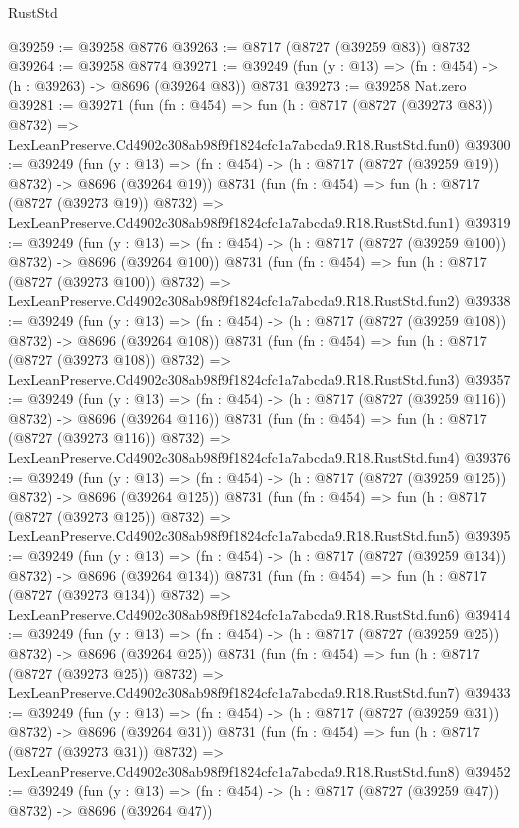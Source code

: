 \begin{lexlean}{RustStd}
\begin{coremodule}
@39259 := @39258 @8776
@39263 := @8717 (@8727 (@39259 @83)) @8732
@39264 := @39258 @8774
@39271 := @39249 (fun (y : @13) => (fn : @454) -> (h : @39263) -> @8696 (@39264 @83)) @8731
@39273 := @39258 Nat.zero
@39281 := @39271
    (fun (fn : @454) =>
    fun (h : @8717 (@8727 (@39273 @83)) @8732) =>
    LexLeanPreserve.Cd4902c308ab98f9f1824cfc1a7abcda9.R18.RustStd.fun0)
@39300 := @39249
    (fun (y : @13) => (fn : @454) -> (h : @8717 (@8727 (@39259 @19)) @8732) -> @8696 (@39264 @19))
    @8731
    (fun (fn : @454) =>
    fun (h : @8717 (@8727 (@39273 @19)) @8732) =>
    LexLeanPreserve.Cd4902c308ab98f9f1824cfc1a7abcda9.R18.RustStd.fun1)
@39319 := @39249
    (fun (y : @13) => (fn : @454) -> (h : @8717 (@8727 (@39259 @100)) @8732) -> @8696 (@39264 @100))
    @8731
    (fun (fn : @454) =>
    fun (h : @8717 (@8727 (@39273 @100)) @8732) =>
    LexLeanPreserve.Cd4902c308ab98f9f1824cfc1a7abcda9.R18.RustStd.fun2)
@39338 := @39249
    (fun (y : @13) => (fn : @454) -> (h : @8717 (@8727 (@39259 @108)) @8732) -> @8696 (@39264 @108))
    @8731
    (fun (fn : @454) =>
    fun (h : @8717 (@8727 (@39273 @108)) @8732) =>
    LexLeanPreserve.Cd4902c308ab98f9f1824cfc1a7abcda9.R18.RustStd.fun3)
@39357 := @39249
    (fun (y : @13) => (fn : @454) -> (h : @8717 (@8727 (@39259 @116)) @8732) -> @8696 (@39264 @116))
    @8731
    (fun (fn : @454) =>
    fun (h : @8717 (@8727 (@39273 @116)) @8732) =>
    LexLeanPreserve.Cd4902c308ab98f9f1824cfc1a7abcda9.R18.RustStd.fun4)
@39376 := @39249
    (fun (y : @13) => (fn : @454) -> (h : @8717 (@8727 (@39259 @125)) @8732) -> @8696 (@39264 @125))
    @8731
    (fun (fn : @454) =>
    fun (h : @8717 (@8727 (@39273 @125)) @8732) =>
    LexLeanPreserve.Cd4902c308ab98f9f1824cfc1a7abcda9.R18.RustStd.fun5)
@39395 := @39249
    (fun (y : @13) => (fn : @454) -> (h : @8717 (@8727 (@39259 @134)) @8732) -> @8696 (@39264 @134))
    @8731
    (fun (fn : @454) =>
    fun (h : @8717 (@8727 (@39273 @134)) @8732) =>
    LexLeanPreserve.Cd4902c308ab98f9f1824cfc1a7abcda9.R18.RustStd.fun6)
@39414 := @39249
    (fun (y : @13) => (fn : @454) -> (h : @8717 (@8727 (@39259 @25)) @8732) -> @8696 (@39264 @25))
    @8731
    (fun (fn : @454) =>
    fun (h : @8717 (@8727 (@39273 @25)) @8732) =>
    LexLeanPreserve.Cd4902c308ab98f9f1824cfc1a7abcda9.R18.RustStd.fun7)
@39433 := @39249
    (fun (y : @13) => (fn : @454) -> (h : @8717 (@8727 (@39259 @31)) @8732) -> @8696 (@39264 @31))
    @8731
    (fun (fn : @454) =>
    fun (h : @8717 (@8727 (@39273 @31)) @8732) =>
    LexLeanPreserve.Cd4902c308ab98f9f1824cfc1a7abcda9.R18.RustStd.fun8)
@39452 := @39249
    (fun (y : @13) => (fn : @454) -> (h : @8717 (@8727 (@39259 @47)) @8732) -> @8696 (@39264 @47))

\end{coremodule}
\end{lexlean}
